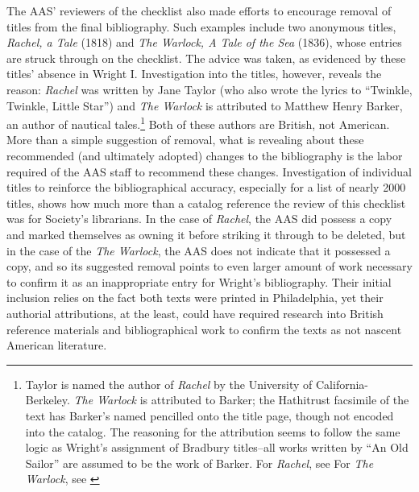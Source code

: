 The AAS' reviewers of the checklist also made efforts to encourage removal of titles from the final bibliography. Such examples include two anonymous titles, \textit{Rachel, a Tale} (1818) and \textit{The Warlock, A Tale of the Sea} (1836), whose entries are struck through on the checklist. The advice was taken, as evidenced by these titles' absence in Wright I. Investigation into the titles, however, reveals the reason: \textit{Rachel} was written by Jane Taylor (who also wrote the lyrics to ``Twinkle, Twinkle, Little Star'') and \textit{The Warlock} is attributed to Matthew Henry Barker, an author of nautical tales.\footnote{Taylor is named the author of \textit{Rachel} by the University of California-Berkeley. \textit{The Warlock} is attributed to Barker; the Hathitrust facsimile of the text has Barker's named pencilled onto the title page, though not encoded into the catalog. The reasoning for the attribution seems to follow the same logic as Wright's assignment of Bradbury titles--all works written by ``An Old Sailor'' are assumed to be the work of Barker. For \textit{Rachel}, see \autocite{taylor_rachel:_1817} For \textit{The Warlock}, see \autocite{old_sailor_warlock:_1836}} Both of these authors are British, not American. More than a simple suggestion of removal, what is revealing about these recommended (and ultimately adopted) changes to the bibliography is the labor required of the AAS staff to recommend these changes. Investigation of individual titles to reinforce the bibliographical accuracy, especially for a list of nearly 2000 titles, shows how much more than a catalog reference the review of this checklist was for Society's librarians. In the case of \textit{Rachel}, the AAS did possess a copy and marked themselves as owning it before striking it through to be deleted, but in the case of the \textit{The Warlock}, the AAS does not indicate that it possessed a copy, and so its suggested removal points to even larger amount of work necessary to confirm it as an inappropriate entry for Wright's bibliography. Their initial inclusion relies on the fact both texts were printed in Philadelphia, yet their authorial attributions, at the least, could have required research into British reference materials and bibliographical work to confirm the texts as not nascent American literature. 

